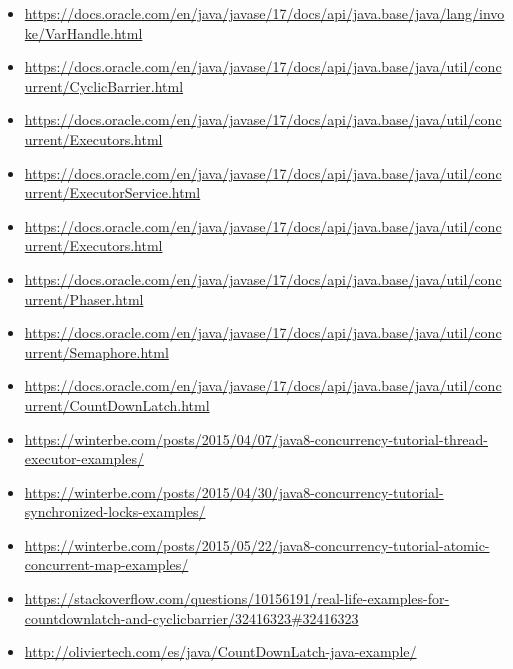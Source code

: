 \documentclass{latex/classes/myarticle}
\begin{document}
\begin{itemize}
\item \url{https://docs.oracle.com/en/java/javase/17/docs/api/java.base/java/lang/invoke/VarHandle.html}
\item \url{https://docs.oracle.com/en/java/javase/17/docs/api/java.base/java/util/concurrent/CyclicBarrier.html}
\item \url{https://docs.oracle.com/en/java/javase/17/docs/api/java.base/java/util/concurrent/Executors.html}
\item \url{https://docs.oracle.com/en/java/javase/17/docs/api/java.base/java/util/concurrent/ExecutorService.html}
\item \url{https://docs.oracle.com/en/java/javase/17/docs/api/java.base/java/util/concurrent/Executors.html}
\item \url{https://docs.oracle.com/en/java/javase/17/docs/api/java.base/java/util/concurrent/Phaser.html}
\item \url{https://docs.oracle.com/en/java/javase/17/docs/api/java.base/java/util/concurrent/Semaphore.html}
\item \url{https://docs.oracle.com/en/java/javase/17/docs/api/java.base/java/util/concurrent/CountDownLatch.html}
\item \url{https://winterbe.com/posts/2015/04/07/java8-concurrency-tutorial-thread-executor-examples/}
\item \url{https://winterbe.com/posts/2015/04/30/java8-concurrency-tutorial-synchronized-locks-examples/}
\item \url{https://winterbe.com/posts/2015/05/22/java8-concurrency-tutorial-atomic-concurrent-map-examples/}
\item \url{https://stackoverflow.com/questions/10156191/real-life-examples-for-countdownlatch-and-cyclicbarrier/32416323\#32416323}
\item \url{http://oliviertech.com/es/java/CountDownLatch-java-example/}
\end{itemize}
\end{document}
